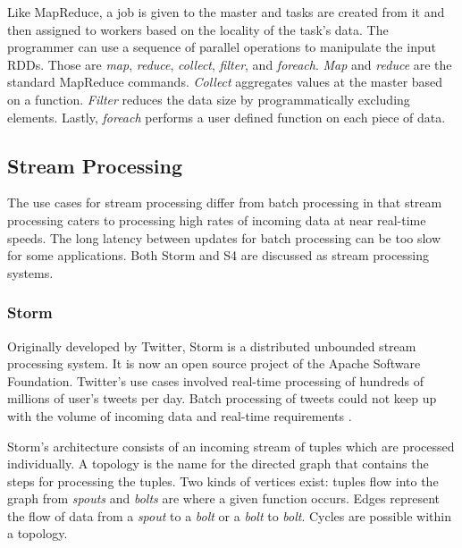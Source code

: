 \documentclass[12pt]{article}
\begin{document}
Like MapReduce, a job is given to the master and tasks are created from it and then assigned to workers based on the locality of the task's data. The programmer can use a sequence of parallel operations to manipulate the input RDDs. Those are \emph{map}, \emph{reduce}, \emph{collect}, \emph{filter}, and \emph{foreach}. \emph{Map} and \emph{reduce} are the standard MapReduce commands. \emph{Collect} aggregates values at the master based on a function. \emph{Filter} reduces the data size by programmatically excluding elements. Lastly, \emph{foreach} performs a user defined function on each piece of data.





\subsection{Stream Processing} \label{sub:stream}


The use cases for stream processing differ from batch processing in that stream processing caters to processing high rates of incoming data at near real-time speeds. The long latency between updates for batch processing can be too slow for some applications. Both Storm \cite{toshniwal2014storm} and S4 \cite{neumeyer2010s4} are discussed as stream processing systems.

\subsubsection{Storm}

Originally developed by Twitter, Storm \cite{toshniwal2014storm} is a distributed unbounded stream processing system. It is now an open source project of the Apache Software Foundation. Twitter's use cases involved real-time processing of hundreds of millions of user's tweets per day. Batch processing of tweets could not keep up with the volume of incoming data and real-time requirements \cite{toshniwal2014storm}.

Storm's architecture consists of an incoming stream of tuples which are processed individually. A topology is the name for the directed graph that contains the steps for processing the tuples. Two kinds of vertices exist: tuples flow into the graph from \textit{spouts} and \textit{bolts} are where a given function occurs. Edges represent the flow of data from a \textit{spout} to a \textit{bolt} or a \textit{bolt} to \textit{bolt}. Cycles are possible within a topology.
\end{document}
